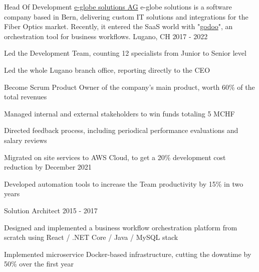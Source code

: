 \begin{cventries}
	\cventry
	{Head Of Development} %
	{\href{https://www.e-globe-solutions.com}{e-globe solutions AG}} %
  {e-globe solutions is a software company based in Bern, delivering custom IT solutions and integrations for the Fiber Optics market. Recently, it entered the SaaS world with "\href{https://www.godoo.ch}{godoo}", an orchestration tool for business workflows.} %
	{Lugano, CH} %
	{2017 - 2022} %
	{
		\begin{cvitems} %
			\item {Led the Development Team, counting 12 specialists from Junior to Senior level}
			\item {Led the whole Lugano branch office, reporting directly to the CEO}
			\item {Become Scrum Product Owner of the company's main product, worth 60\% of the total revenues}
			\item {Managed internal and external stakeholders to win funds totaling 5 MCHF}
			\item {Directed feedback process, including periodical performance evaluations and salary reviews}
			\item {Migrated on site services to AWS Cloud, to get a 20\% development cost reduction by December 2021}
			\item {Developed automation tools to increase the Team productivity by 15\% in two years}
		\end{cvitems}
	}

  \cventry
    {Solution Architect} %
    {} %
    {} %
    {} %
    {2015 - 2017} %
    {
      \begin{cvitems} %
        \item {Designed and implemented a business workflow orchestration platform from scratch using React / .NET Core / Java / MySQL stack}
        \item {Implemented microservice Docker-based infrastructure, cutting the downtime by 50\% over the first year}
      \end{cvitems}
    }


\end{cventries}
